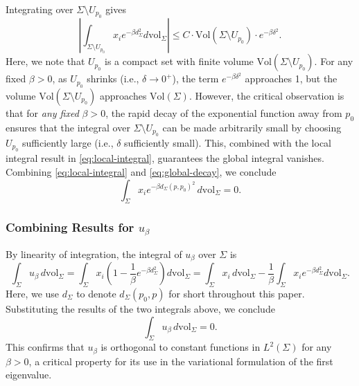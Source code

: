 \documentclass[a4, 12pt]{amsart}
\numberwithin{equation}{section} \numberwithin{equation}{section}
\begin{document}
Integrating over $\Sigma \setminus U_{p_0}$   gives
\begin{equation}\label{eq:global-decay}
\left| \int_{\Sigma \setminus U_{p_0}} x_i e^{-\beta d_{\Sigma}^2} d\mathrm{vol}_{\Sigma} \right| \leq C \cdot \text{Vol}(\Sigma \setminus U_{p_0}) \cdot e^{-\beta \delta^2}.
\end{equation}Here, we note that $U_{p_0}$ is a compact set with finite volume $\text{Vol}(\Sigma \setminus U_{p_0})$.
For any fixed $\beta > 0$, as $U_{p_0}$ shrinks (i.e., $\delta \to 0^+$), the term $e^{-\beta \delta^2}$ approaches 1, but the volume $\text{Vol}(\Sigma \setminus U_{p_0})$ approaches $\text{Vol}(\Sigma)$. However, the critical observation is that for \textit{any fixed} $\beta > 0$, the rapid decay of the exponential function away from $p_0$ ensures that the integral over $\Sigma \setminus U_{p_0}$ can be made arbitrarily small by choosing $U_{p_0}$ sufficiently large (i.e., $\delta$ sufficiently small). This, combined with the local integral result in \eqref{eq:local-integral}, guarantees the global integral vanishes.
Combining \eqref{eq:local-integral} and \eqref{eq:global-decay}, we conclude
\begin{equation}\label{eq:adjustment-integral}
\int_{\Sigma} x_i e^{-\beta d_{\Sigma}(p, p_0)^2} \, d\mathrm{vol}_{\Sigma} = 0.
\end{equation}


\subsubsection{Combining Results for $u_{\beta}$}

By linearity of integration, the integral of $u_{\beta}$ over $\Sigma$ is
\begin{equation*}
\int_{\Sigma} u_{\beta} \, d\mathrm{vol}_{\Sigma} = \int_{\Sigma} x_i \left(1 - \frac{1}{\beta} e^{-\beta d_{\Sigma}^2}\right) d\mathrm{vol}_{\Sigma} = \int_{\Sigma} x_i \, d\mathrm{vol}_{\Sigma} - \frac{1}{\beta} \int_{\Sigma} x_i e^{-\beta d_{\Sigma}^2} d\mathrm{vol}_{\Sigma}.
\end{equation*}Here, we use $d_{\Sigma}$ to denote $d_{\Sigma}(p_{0},p)$ for short throughout this paper.
Substituting the results of the two integrals above, we conclude
\begin{equation*}
\int_{\Sigma} u_{\beta} \, d\mathrm{vol}_{\Sigma} = 0.
\end{equation*}
This confirms that $u_{\beta}$ is orthogonal to constant functions in $L^2(\Sigma)$ for any $\beta > 0$, a critical property for its use in the variational formulation of the first eigenvalue.
\end{document}
